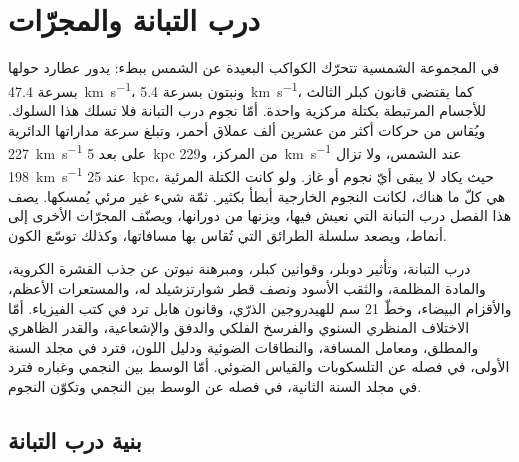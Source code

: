 \chapter{درب التبانة والمجرّات}\label{ch:b3:milky-way-galaxies}

في المجموعة الشمسية تتحرّك الكواكب البعيدة عن الشمس ببطء: يدور عطارد
حولها بسرعة \qty{47.4}{km.s^{-1}}، ونبتون بسرعة \qty{5.4}{km.s^{-1}}، كما يقتضي
قانون كبلر الثالث للأجسام المرتبطة بكتلة مركزية واحدة. أمّا نجوم
درب التبانة فلا تسلك هذا السلوك. ويُقاس من حركات أكثر من
عشرين ألف عملاق أحمر، وتبلغ سرعة مداراتها الدائرية
\qty{227}{km.s^{-1}} على بعد \qty{5}{kpc} من المركز، و\qty{229}{km.s^{-1}}
عند الشمس، ولا تزال \qty{198}{km.s^{-1}} عند \qty{25}{kpc}، حيث يكاد لا يبقى
أيّ نجوم أو غاز. ولو كانت الكتلة المرئية هي كلّ ما هناك، لكانت النجوم الخارجية
أبطأ بكثير. ثمّة شيء غير مرئي يُمسكها. يصف هذا الفصل درب التبانة التي نعيش فيها،
ويزنها من دورانها، ويصنّف المجرّات الأخرى إلى أنماط،
ويصعد سلسلة الطرائق التي تُقاس بها مسافاتها،
وكذلك توسّع الكون.

\begin{recall}
درب التبانة، وتأثير دوبلر، وقوانين كبلر، ومبرهنة نيوتن عن جذب القشرة الكروية،
والمادة المظلمة، والثقب الأسود ونصف قطر شوارتزشيلد له، والمستعرات الأعظم،
والأقزام البيضاء، وخطّ 21 سم للهيدروجين الذرّي، وقانون هابل
ترد في كتب الفيزياء. أمّا الاختلاف المنظري السنوي والفرسخ الفلكي
والدفق والإشعاعية، والقدر الظاهري والمطلق، ومعامل المسافة، والنطاقات الضوئية
ودليل اللون، فترد في
مجلد السنة الأولى، في فصله عن التلسكوبات والقياس الضوئي. أمّا الوسط بين النجمي
وغباره فترد في مجلد السنة الثانية، في فصله عن الوسط بين النجمي
وتكوّن النجوم.
\end{recall}

\section{بنية درب التبانة}\label{sec:b3:milky-way-galaxies:structure}

